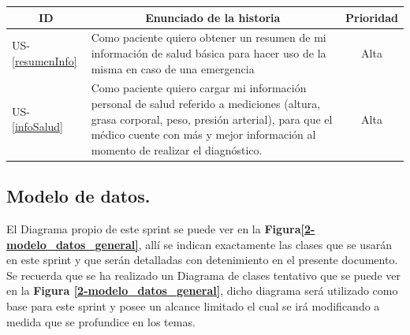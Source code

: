 \documentclass[a4paper,12pt]{article}
\begin{document}
\begin{table}[h]
    \centering
	\begin{tabular}{|l|p{9cm}|c|}
	\hline
        \multicolumn{1}{|c|}{\textbf{ID}} &
        \multicolumn{1}{|c|}{\textbf{Enunciado de la historia}} &
        \textbf{Prioridad} \\          
    \hline
        US-\ref{resumenInfo} &
        Como paciente quiero obtener un resumen de mi información de salud básica para hacer uso de la misma en caso de una emergencia &Alta
        \\
    \hline 
	    US-\ref{infoSalud} &
        Como paciente quiero cargar mi información personal de salud referido a mediciones (altura, grasa corporal, peso, presión arterial), para que el médico cuente con más y mejor información al momento de realizar el diagnóstico. & Alta
        \\
    \hline
    \end{tabular}
    \label{US-Sprint1}
\end{table}

\subsection{ Modelo de datos.}
El Diagrama propio de este sprint se puede ver en la \textbf{Figura\ref{2-modelo_datos_general}}, allí se indican exactamente las clases que se usarán en este sprint y que serán detalladas con detenimiento en el presente documento. Se recuerda que se ha realizado un Diagrama de clases tentativo que se puede ver en la \textbf{Figura \ref{2-modelo_datos_general}}, dicho diagrama  será utilizado como base para este sprint y posee un alcance limitado el cual se irá modificando a medida que se profundice en los temas.
\end{document}
